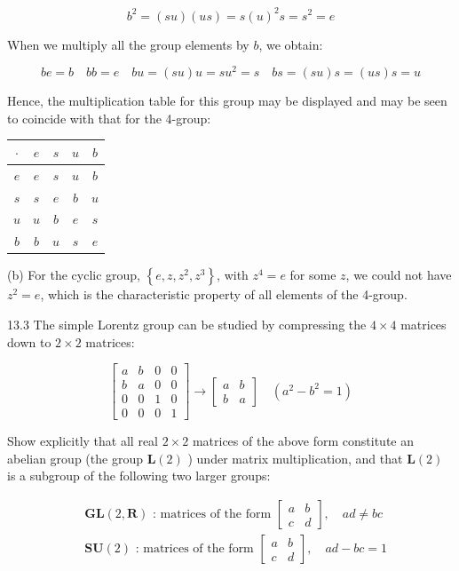 \documentclass[10pt]{article}
\begin{document}
$$
b^{2}=(s u)(u s)=s(u)^{2} s=s^{2}=e
$$

When we multiply all the group elements by $b$, we obtain:

$$
b e=b \quad b b=e \quad b u=(s u) u=s u^{2}=s \quad b s=(s u) s=(u s) s=u
$$

Hence, the multiplication table for this group may be displayed and may be seen to coincide with that for the 4-group:

\begin{center}
\begin{tabular}{c|cccc}
$\cdot$ & $e$ & $s$ & $u$ & $b$ \\
\hline
$e$ & $e$ & $s$ & $u$ & $b$ \\
$s$ & $s$ & $e$ & $b$ & $u$ \\
$u$ & $u$ & $b$ & $e$ & $s$ \\
$b$ & $b$ & $u$ & $s$ & $e$ \\
\end{tabular}
\end{center}

(b) For the cyclic group, $\left\{e, z, z^{2}, z^{3}\right\}$, with $z^{4}=e$ for some $z$, we could not have $z^{2}=e$, which is the characteristic property of all elements of the 4-group.

13.3 The simple Lorentz group can be studied by compressing the $4 \times 4$ matrices down to $2 \times 2$ matrices:

$$
\left[\begin{array}{llll}
a & b & 0 & 0 \\
b & a & 0 & 0 \\
0 & 0 & 1 & 0 \\
0 & 0 & 0 & 1
\end{array}\right] \rightarrow\left[\begin{array}{ll}
a & b \\
b & a
\end{array}\right] \quad\left(a^{2}-b^{2}=1\right)
$$

Show explicitly that all real $2 \times 2$ matrices of the above form constitute an abelian group (the group $\mathbf{L}(2)$ ) under matrix multiplication, and that $\mathbf{L}(2)$ is a subgroup of the following two larger groups:

$$
\begin{aligned}
& \mathbf{G L}(2, \mathbf{R}) \text { : matrices of the form }\left[\begin{array}{ll}
a & b \\
c & d
\end{array}\right], \quad a d \neq b c \\
& \mathbf{S U}(2) \text { : matrices of the form }\left[\begin{array}{ll}
a & b \\
c & d
\end{array}\right], \quad a d-b c=1
\end{aligned}
$$
\end{document}
